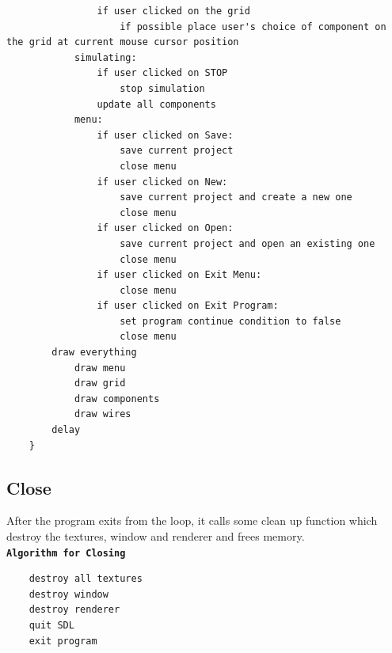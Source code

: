 \documentclass[report]{subfiles}
\begin{document}
\begin{verbatim}
                if user clicked on the grid
                    if possible place user's choice of component on the grid at current mouse cursor position
            simulating:
                if user clicked on STOP
                    stop simulation
                update all components
            menu:
                if user clicked on Save:
                    save current project
                    close menu
                if user clicked on New:
                    save current project and create a new one
                    close menu
                if user clicked on Open:
                    save current project and open an existing one
                    close menu
                if user clicked on Exit Menu:
                    close menu
                if user clicked on Exit Program:
                    set program continue condition to false 
                    close menu
        draw everything
            draw menu
            draw grid
            draw components
            draw wires
        delay
    }
        \end{verbatim}
    \subsection{Close}
    After the program exits from the loop, it calls some clean up function which destroy the textures, window and renderer and frees memory.\\
        \textbf{\texttt{Algorithm for Closing}}
        \begin{verbatim}
    destroy all textures
    destroy window
    destroy renderer
    quit SDL
    exit program
        \end{verbatim}
\end{document}
